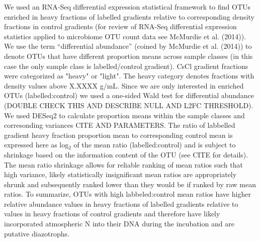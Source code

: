 We used an RNA-Seq differential expression statistical framework to find OTUs enriched in heavy fractions of labelled gradients relative to corresponding density fractions in control gradients (for review of RNA-Seq differential expression statistics applied to microbiome OTU count data see McMurdie et al. (2014)). We use the term “differential abundance” (coined by McMurdie et al. (2014)) to denote OTUs that have different proportion means across sample classes (in this case the only sample class is labelled/control gradient). CsCl gradient fractions were categorized as "heavy" or "light". The heavy category denotes fractions with density values above X.XXXX g/mL. Since we are only interested in enriched OTUs (labelled:control) we used a one-sided Wald test for differential abundance (DOUBLE CHECK THIS AND DESCRIBE NULL AND L2FC THRESHOLD). We used DESeq2 to calculate proportion means within the sample classes and corresonding variances CITE AND PARAMETERS. The ratio of labbelled gradient heavy fraction proportion mean to corresponding control mean is expressed here as log$_{2}$ of the mean ratio (labelled:control) and is subject to shrinkage based on the information content of the OTU (see CITE for details). The mean ratio shrinkage allows for reliable ranking of mean ratios such that high variance, likely statistically insignificant mean ratios are appropriately shrunk and subsequently ranked lower than they would be if ranked by raw mean ratios. To summarize, OTUs with high labbeled:control mean ratios have higher relative abundance values in heavy fractions of labelled gradients relative to values in heavy fractions of control gradients and therefore have likely incorporated atmospheric N into their DNA during  the incubation and are putative diazotrophs.

